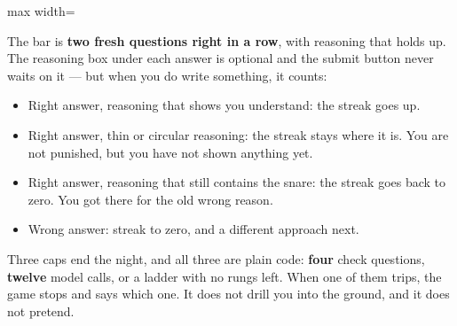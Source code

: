 \documentclass[11pt]{article}
\begin{document}
\begin{center}
\begin{adjustbox}{max width=\textwidth}
\end{adjustbox}
\end{center}

\vspace{0.2em}
The bar is \textbf{two fresh questions right in a row}, with reasoning that
holds up. The reasoning box under each answer is optional and the submit button
never waits on it --- but when you do write something, it counts:

\begin{itemize}
  \item Right answer, reasoning that shows you understand: the streak goes up.
  \item Right answer, thin or circular reasoning: the streak stays where it is.
        You are not punished, but you have not shown anything yet.
  \item Right answer, reasoning that still contains the snare: the streak goes
        back to zero. You got there for the old wrong reason.
  \item Wrong answer: streak to zero, and a different approach next.
\end{itemize}

Three caps end the night, and all three are plain code: \textbf{four} check
questions, \textbf{twelve} model calls, or a ladder with no rungs left. When
one of them trips, the game stops and says which one. It does not drill you
into the ground, and it does not pretend.
\end{document}
